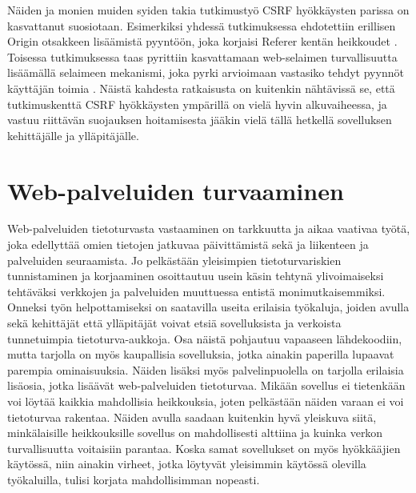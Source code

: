 Näiden ja monien muiden syiden takia tutkimustyö CSRF hyökkäysten parissa on kasvattanut suosiotaan. Esimerkiksi yhdessä tutkimuksessa ehdotettiin erillisen Origin
otsakkeen lisäämistä pyyntöön, joka korjaisi Referer kentän heikkoudet \cite{CSRF}. Toisessa tutkimuksessa taas pyrittiin kasvattamaan web-selaimen turvallisuutta
lisäämällä selaimeen mekanismi, joka pyrki arvioimaan vastasiko tehdyt pyynnöt käyttäjän toimia \cite{CSRFb}. Näistä kahdesta ratkaisusta on kuitenkin nähtävissä se,
että tutkimuskenttä CSRF hyökkäysten ympärillä on vielä hyvin alkuvaiheessa, ja vastuu riittävän suojauksen hoitamisesta jääkin vielä tällä hetkellä 
sovelluksen kehittäjälle ja ylläpitäjälle.

\section{Web-palveluiden turvaaminen}

Web-palveluiden tietoturvasta vastaaminen on tarkkuutta ja aikaa vaativaa työtä, joka edellyttää omien tietojen jatkuvaa päivittämistä sekä ja liikenteen ja palveluiden
seuraamista. Jo pelkästään yleisimpien tietoturvariskien tunnistaminen ja korjaaminen osoittautuu usein käsin tehtynä ylivoimaiseksi tehtäväksi verkkojen ja palveluiden
muuttuessa entistä monimutkaisemmiksi. Onneksi työn helpottamiseksi on saatavilla useita erilaisia työkaluja, joiden avulla sekä kehittäjät että ylläpitäjät voivat
etsiä sovelluksista ja verkoista tunnetuimpia tietoturva-aukkoja. Osa näistä pohjautuu vapaaseen lähdekoodiin, mutta tarjolla on myös kaupallisia sovelluksia, jotka ainakin 
paperilla lupaavat parempia ominaisuuksia. Näiden lisäksi myös palvelinpuolella on tarjolla erilaisia lisäosia, jotka lisäävät web-palveluiden tietoturvaa. 
Mikään sovellus ei tietenkään voi löytää kaikkia mahdollisia heikkouksia, joten pelkästään näiden varaan ei voi tietoturvaa rakentaa. Näiden avulla 
saadaan kuitenkin hyvä yleiskuva siitä, minkälaisille heikkouksille sovellus on mahdollisesti alttiina ja kuinka verkon turvallisuutta voitaisiin parantaa. Koska samat 
sovellukset on myös hyökkääjien käytössä, niin ainakin virheet, jotka löytyvät yleisimmin käytössä olevilla työkaluilla, tulisi korjata mahdollisimman nopeasti. 

